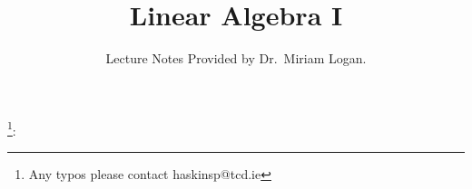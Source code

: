 \documentclass{report}
\begin{document}
\title{Linear Algebra I}
\author{Lecture Notes Provided by Dr.~Miriam Logan.}
\date{}
\maketitle
\tableofcontents
\newpage


%
%

\hline
\newpage



\footnote{Any typos please contact haskinsp@tcd.ie}:
\end{document}

